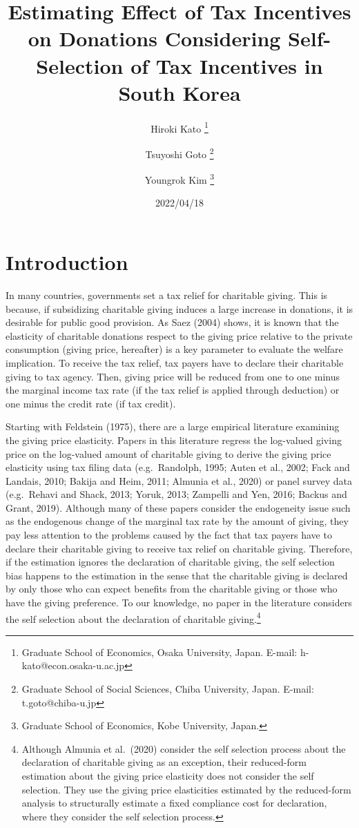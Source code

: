 \documentclass[
  11pt,
  a4paper,
]{article}
\title{Estimating Effect of Tax Incentives on Donations Considering Self-Selection of Tax Incentives in South Korea  }
\author{
    Hiroki Kato
  \thanks{Graduate School of Economics, Osaka University, Japan. E-mail: h-kato@econ.osaka-u.ac.jp  }
  \and
    Tsuyoshi Goto
  \thanks{Graduate School of Social Sciences, Chiba University, Japan. E-mail: t.goto@chiba-u.jp  }
  \and
    Youngrok Kim
  \thanks{Graduate School of Economics, Kobe University, Japan.  }
  \and
  }
\date{2022/04/18}
\begin{document}
\begin{spacing}{1}
  \maketitle
\end{spacing}

\hypertarget{intro}{%
\section{Introduction}\label{intro}}

In many countries, governments set a tax relief for charitable giving.
This is because, if subsidizing charitable giving induces a large increase in donations,
it is desirable for public good provision.
As Saez (2004) shows,
it is known that
the elasticity of charitable donations
respect to the giving price relative to the private consumption (giving price, hereafter) is
a key parameter to evaluate the welfare implication.
To receive the tax relief, tax payers have to declare their charitable giving to tax agency.
Then, giving price will be reduced from one to one minus the marginal income tax rate
(if the tax relief is applied through deduction) or one minus the credit rate (if tax credit).

Starting with Feldstein (1975),
there are a large empirical literature examining the giving price elasticity.
Papers in this literature regress the log-valued giving price on
the log-valued amount of charitable giving
to derive the giving price elasticity
using tax filing data
(e.g.~Randolph, 1995; Auten et al., 2002; Fack and Landais, 2010; Bakija and Heim, 2011; Almunia et al., 2020)
or panel survey data (e.g.~Rehavi and Shack, 2013; Yoruk, 2013; Zampelli and Yen, 2016; Backus and Grant, 2019).
Although many of these papers consider the endogeneity issue
such as the endogenous change of the marginal tax rate by the amount of giving,
they pay less attention to the problems caused by the fact that
tax payers have to declare their charitable giving to receive tax relief on charitable giving.
Therefore, if the estimation ignores the declaration of charitable giving,
the self selection bias happens to the estimation
in the sense that the charitable giving is declared by
only those who can expect benefits from the charitable giving or
those who have the giving preference.
To our knowledge,
no paper in the literature considers the self selection
about the declaration of charitable giving.\footnote{Although Almunia et al.~(2020) consider
  the self selection process about the declaration of charitable giving as an exception,
  their reduced-form estimation about the giving price elasticity
  does not consider the self selection.
  They use the giving price elasticities estimated by the reduced-form analysis to
  structurally estimate a fixed compliance cost for declaration,
  where they consider the self selection process.}
\end{document}
